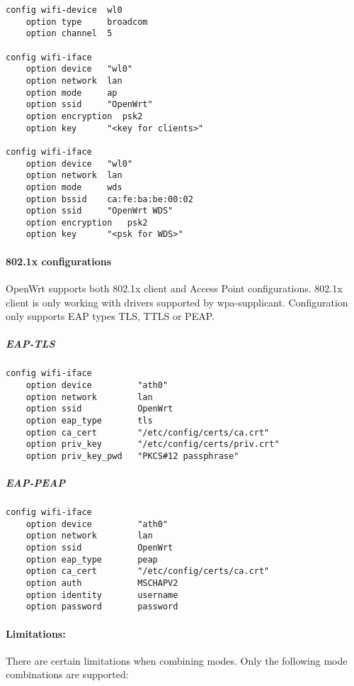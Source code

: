 \begin{Verbatim}
config wifi-device  wl0
    option type     broadcom
    option channel  5

config wifi-iface
    option device   "wl0"
    option network  lan
    option mode     ap
    option ssid     "OpenWrt"
    option encryption  psk2
    option key      "<key for clients>"

config wifi-iface
    option device   "wl0"
    option network  lan
    option mode     wds
    option bssid    ca:fe:ba:be:00:02
    option ssid     "OpenWrt WDS"
    option encryption	psk2
    option key      "<psk for WDS>"
\end{Verbatim}

\paragraph{802.1x configurations}

OpenWrt supports both 802.1x client and Access Point
configurations. 802.1x client is only working with
drivers supported by wpa-supplicant. Configuration
only supports EAP types TLS, TTLS or PEAP.

\subparagraph{EAP-TLS}

\begin{Verbatim}
config wifi-iface
    option device         "ath0"
    option network        lan
    option ssid           OpenWrt
    option eap_type       tls
    option ca_cert        "/etc/config/certs/ca.crt"
    option priv_key       "/etc/config/certs/priv.crt"
    option priv_key_pwd   "PKCS#12 passphrase"
\end{Verbatim}

\subparagraph{EAP-PEAP}

\begin{Verbatim}
config wifi-iface
    option device         "ath0"
    option network        lan
    option ssid           OpenWrt
    option eap_type       peap
    option ca_cert        "/etc/config/certs/ca.crt"
    option auth           MSCHAPV2
    option identity       username
    option password       password
\end{Verbatim}

\paragraph{Limitations:}

There are certain limitations when combining modes.
Only the following mode combinations are supported:

